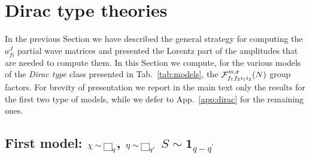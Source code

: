 \documentclass[a4paper,11pt]{article}
\begin{document}
\section{Dirac type theories}\label{sec:gauge-dirac}

In the previous Section we have described the general strategy for computing the $a_{fi}^J$ partial wave matrices and presented the Lorentz part of the amplitudes that are needed to compute them. In this Section we compute, for the various models of the {\emph{Dirac type}} class presented in Tab.~\ref{tab:models}, the ${\cal F}^{m, {\rm {\bf{r}}}}_{f_1 f_2 i_1 i_2} (N)$ group factors. For brevity of presentation we report in the main text only the results for the first two type of models, while we defer to App.~\ref{app:dirac} for the remaining ones.


\subsection{First model: $\chi\sim {\tiny{\fbox{$\protect\phantom s$} }}_q$, $\eta\sim {\tiny{\fbox{$\protect\phantom s$} }}_{q^\prime}$ $S\sim \mathbf{1}_{q-q^\prime}$ }\label{sec:model1}
\end{document}
